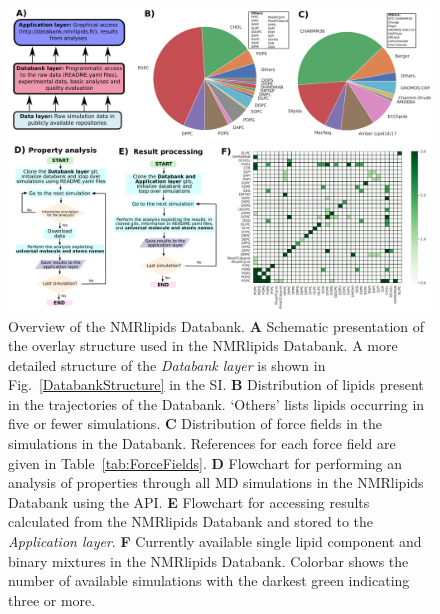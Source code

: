 \documentclass[fleqn,10pt]{wlscirep}
\begin{document}
\begin{figure}[t]
    \centering
    \includegraphics[width=\linewidth]{Figures/overlay3.pdf}
    \caption{Overview of the NMRlipids Databank. 
    \textbf{A} Schematic presentation of the overlay structure used in the NMRlipids Databank. A more detailed structure of the \textit{Databank layer} is shown in Fig.~\ref{DatabankStructure} in the SI.
    \textbf{B} Distribution of lipids present in the trajectories of the Databank. `Others' lists lipids occurring in five or fewer simulations. 
    \textbf{C} Distribution of force fields in the simulations in the Databank. References for each force field are given in Table~\ref{tab:ForceFields}.
    \textbf{D} Flowchart for performing an analysis of properties through all MD simulations in the NMRlipids Databank using the API.
    \textbf{E} Flowchart for accessing results calculated from the NMRlipids Databank and stored to the \textit{Application layer}.
    \textbf{F} Currently available single lipid component and binary mixtures in the NMRlipids Databank. Colorbar shows the number of available simulations with the darkest green indicating three or more.  
    }
    \label{fig:overlay}
\end{figure}
\end{document}
